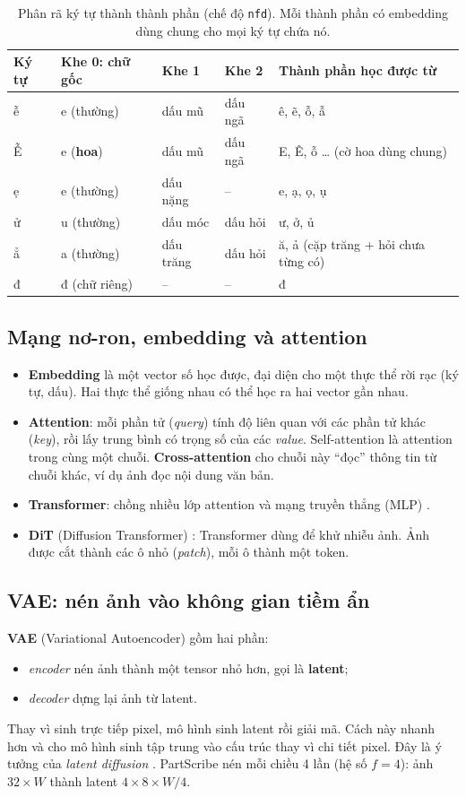 \documentclass[11pt,a4paper]{article}
\begin{document}
\begin{table}[h]
\centering\small
\caption{Phân rã ký tự thành thành phần (chế độ \texttt{nfd}). Mỗi thành phần có embedding dùng chung cho mọi ký tự chứa nó.}
\label{tab:nfd}
\begin{tabular}{lllll}
\toprule
Ký tự & Khe 0: chữ gốc & Khe 1 & Khe 2 & Thành phần học được từ \\
\midrule
ễ & e (thường) & dấu mũ & dấu ngã & ê, ẽ, ỗ, ẫ \\
Ễ & e (\textbf{hoa}) & dấu mũ & dấu ngã & E, Ê, ỗ \dots{} (cờ hoa dùng chung) \\
ẹ & e (thường) & dấu nặng & -- & e, ạ, ọ, ụ \\
ử & u (thường) & dấu móc & dấu hỏi & ư, ở, ủ \\
ẳ & a (thường) & dấu trăng & dấu hỏi & ă, ả (cặp trăng + hỏi chưa từng có) \\
đ & đ (chữ riêng) & -- & -- & đ \\
\bottomrule
\end{tabular}
\end{table}

\subsection{Mạng nơ-ron, embedding và attention}
\begin{itemize}
\item \textbf{Embedding} là một vector số học được, đại diện cho một thực thể rời rạc (ký tự, dấu). Hai thực thể giống nhau có thể học ra hai vector gần nhau.
\item \textbf{Attention}: mỗi phần tử (\emph{query}) tính độ liên quan với các phần tử khác (\emph{key}), rồi lấy trung bình có trọng số của các \emph{value}. Self-attention là attention trong cùng một chuỗi. \textbf{Cross-attention} cho chuỗi này ``đọc'' thông tin từ chuỗi khác, ví dụ ảnh đọc nội dung văn bản.
\item \textbf{Transformer}: chồng nhiều lớp attention và mạng truyền thẳng (MLP) \cite{vaswani2017}.
\item \textbf{DiT} (Diffusion Transformer) \cite{peebles2023}: Transformer dùng để khử nhiễu ảnh. Ảnh được cắt thành các ô nhỏ (\emph{patch}), mỗi ô thành một token.
\end{itemize}

\subsection{VAE: nén ảnh vào không gian tiềm ẩn}
\textbf{VAE} (Variational Autoencoder) \cite{kingma2014} gồm hai phần:
\begin{itemize}
\item \emph{encoder} nén ảnh thành một tensor nhỏ hơn, gọi là \textbf{latent};
\item \emph{decoder} dựng lại ảnh từ latent.
\end{itemize}
Thay vì sinh trực tiếp pixel, mô hình sinh latent rồi giải mã. Cách này nhanh hơn và cho mô hình sinh tập trung vào cấu trúc thay vì chi tiết pixel. Đây là ý tưởng của \emph{latent diffusion} \cite{rombach2022}. PartScribe nén mỗi chiều 4 lần (hệ số $f=4$): ảnh $32\times W$ thành latent $4\times 8\times W/4$.
\end{document}
